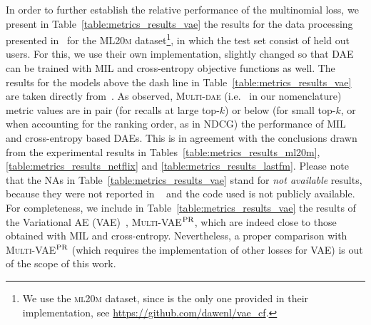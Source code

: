 In order to further establish the relative performance of the multinomial loss, we present in Table~\ref{table:metrics_results_vae} the results for the data processing presented in~\cite{liang:2018:VAE} for the \textsc{ML20m} dataset\footnote{
We use the \textsc{ml20m} dataset, since is the only one provided in their implementation, see \url{https://github.com/dawenl/vae_cf}.
}, in which the test set consist of held out users. For this, we use their own implementation, slightly changed so that DAE can be trained with MIL and cross-entropy objective functions as well. The results for the models above the dash line in Table~\ref{table:metrics_results_vae} are taken directly from~\cite{liang:2018:VAE}. As observed, \textsc{Multi-dae} (i.e. \MULTItanhlin\, in our nomenclature) metric values are in pair (for recalls at large top-$k$) or below (for small top-$k$, or when accounting for the ranking order, as in NDCG) the performance of MIL and cross-entropy based DAEs. This is in agreement with the conclusions drawn from the experimental results in Tables~\ref{table:metrics_results_ml20m}, \ref{table:metrics_results_netflix} and \ref{table:metrics_results_lastfm}. 
Please note that the NAs in Table~\ref{table:metrics_results_vae} stand for \emph{not available} results, because they were not reported in ~\cite{liang:2018:VAE} and the code used is not publicly available.
For completeness, we include in Table~\ref{table:metrics_results_vae} the results of the Variational AE (VAE)~\cite{liang:2018:VAE}, \textsc{Multi-VAE}$^{\rm PR}$, which are indeed close to those obtained with MIL and cross-entropy. Nevertheless, a proper comparison with \textsc{Multi-VAE}$^{\rm PR}$ (which requires the implementation of other losses for VAE) is out of the scope of this work. 

